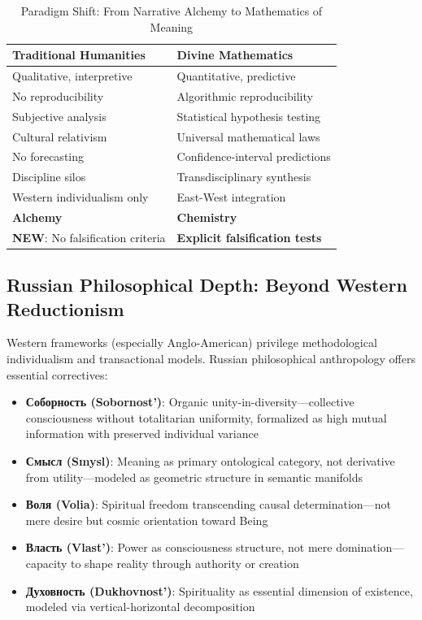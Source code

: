 \documentclass[11pt,a4paper]{article}
\theoremstyle{definition}
\theoremstyle{remark}
\begin{document}
\begin{small}
\begin{table}[H]
\centering
\begin{tabular}{|p{5cm}|p{5.5cm}|}
\hline
\textbf{Traditional Humanities} & \textbf{Divine Mathematics} \\
\hline
Qualitative, interpretive & Quantitative, predictive \\
\hline
No reproducibility & Algorithmic reproducibility \\
\hline
Subjective analysis & Statistical hypothesis testing \\
\hline
Cultural relativism & Universal mathematical laws \\
\hline
No forecasting & Confidence-interval predictions \\
\hline
Discipline silos & Transdisciplinary synthesis \\
\hline
Western individualism only & East-West integration \\
\hline
\textbf{Alchemy} & \textbf{Chemistry} \\
\hline
\rowcolor{green!10}
\textbf{NEW}: No falsification criteria & \textbf{Explicit falsification tests} \\
\hline
\end{tabular}
\caption{Paradigm Shift: From Narrative Alchemy to Mathematics of Meaning}
\end{table}

\subsection{Russian Philosophical Depth: Beyond Western Reductionism}

Western frameworks (especially Anglo-American) privilege methodological individualism and transactional models. Russian philosophical anthropology offers essential correctives:

\begin{itemize}[leftmargin=*]
\item \textbf{Соборность (Sobornost')}: Organic unity-in-diversity—collective consciousness without totalitarian uniformity, formalized as high mutual information with preserved individual variance
\item \textbf{Смысл (Smysl)}: Meaning as primary ontological category, not derivative from utility—modeled as geometric structure in semantic manifolds
\item \textbf{Воля (Volia)}: Spiritual freedom transcending causal determination—not mere desire but cosmic orientation toward Being
\item \textbf{Власть (Vlast')}: Power as consciousness structure, not mere domination—capacity to shape reality through authority or creation
\item \textbf{Духовность (Dukhovnost')}: Spirituality as essential dimension of existence, modeled via vertical-horizontal decomposition
\end{itemize}


\end{small}
\end{document}
